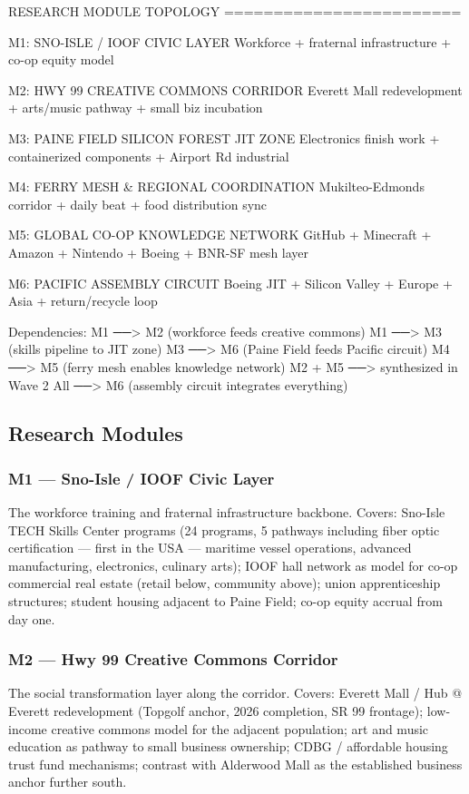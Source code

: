 \documentclass[11pt,letterpaper]{article}
\begin{document}
\begin{asciibox}
RESEARCH MODULE TOPOLOGY
========================

M1: SNO-ISLE / IOOF CIVIC LAYER
   Workforce + fraternal infrastructure + co-op equity model

M2: HWY 99 CREATIVE COMMONS CORRIDOR
   Everett Mall redevelopment + arts/music pathway + small biz incubation

M3: PAINE FIELD SILICON FOREST JIT ZONE
   Electronics finish work + containerized components + Airport Rd industrial

M4: FERRY MESH \& REGIONAL COORDINATION
   Mukilteo-Edmonds corridor + daily beat + food distribution sync

M5: GLOBAL CO-OP KNOWLEDGE NETWORK
   GitHub + Minecraft + Amazon + Nintendo + Boeing + BNR-SF mesh layer

M6: PACIFIC ASSEMBLY CIRCUIT
   Boeing JIT + Silicon Valley + Europe + Asia + return/recycle loop

Dependencies:
  M1 ──> M2 (workforce feeds creative commons)
  M1 ──> M3 (skills pipeline to JIT zone)
  M3 ──> M6 (Paine Field feeds Pacific circuit)
  M4 ──> M5 (ferry mesh enables knowledge network)
  M2 + M5 ──> synthesized in Wave 2
  All ──> M6 (assembly circuit integrates everything)
\end{asciibox}

\subsection{Research Modules}

\subsubsection{M1 --- Sno-Isle / IOOF Civic Layer}
The workforce training and fraternal infrastructure backbone. Covers: Sno-Isle TECH Skills Center programs (24 programs, 5 pathways including fiber optic certification --- first in the USA --- maritime vessel operations, advanced manufacturing, electronics, culinary arts); IOOF hall network as model for co-op commercial real estate (retail below, community above); union apprenticeship structures; student housing adjacent to Paine Field; co-op equity accrual from day one.

\subsubsection{M2 --- Hwy 99 Creative Commons Corridor}
The social transformation layer along the corridor. Covers: Everett Mall / Hub @ Everett redevelopment (Topgolf anchor, 2026 completion, SR 99 frontage); low-income creative commons model for the adjacent population; art and music education as pathway to small business ownership; CDBG / affordable housing trust fund mechanisms; contrast with Alderwood Mall as the established business anchor further south.
\end{document}
